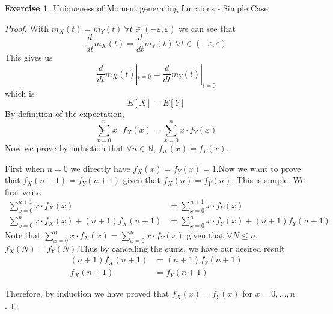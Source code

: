\documentclass[12pt,a4paper]{article}
\theoremstyle{definition}
\newtheorem{exercise}{Exercise}
\begin{document}
\begin{exercise}
    Uniqueness of Moment generating functions - Simple Case
    \begin{proof}
        With $m_X(t)=m_Y(t)\ \forall t\in (-\varepsilon,\varepsilon)$ we can see that
        \begin{equation*}
            \frac{d}{dt}m_X(t)=\frac{d}{dt}m_Y(t) \ \forall t\in (-\varepsilon,\varepsilon)
        \end{equation*}
        This gives us
        \begin{equation*}
            \frac{d}{dt}m_X(t)|_{t=0}=\frac{d}{dt}m_Y(t)|_{t=0}
        \end{equation*}
        which is
        \begin{equation*}
            E[X]=E[Y]
        \end{equation*}
        By definition of the expectation,
        \begin{equation*}
            \sum_{x=0}^{n} x\cdot f_X(x)=\sum_{x=0}^{n} x\cdot f_Y(x)
        \end{equation*}
        Now we prove by induction that $\forall n\in \mathbb{N}$, $f_X(x)=f_Y(x)$.

        First when $n=0$ we directly have $f_X(x)=f_Y(x)=1$.Now we want to prove that $f_X(n+1)=f_Y(n+1)$ given that $f_X(n)=f_Y(n)$. This is simple. We first write
        \begin{equation*}
            \begin{split}
            \sum_{x=0}^{n+1} x\cdot f_X(x)&=\sum_{x=0}^{n+1} x\cdot f_Y(x)\\
            \sum_{x=0}^n x\cdot f_X(x)+(n+1)f_X(n+1)&=\sum_{x=0}^n x\cdot f_Y(x) + (n+1)f_Y(n+1)
            \end{split}
        \end{equation*}
        Note that $\sum_{x=0}^n x\cdot f_X(x)=\sum_{x=0}^n x\cdot f_Y(x)$ given that $\forall N\leq n$, $f_X(N)=f_Y(N)$.Thus by cancelling the sums, we have our desired result
        \begin{equation*}
            \begin{split}
                (n+1)f_X(n+1)&=(n+1)f_Y(n+1)\\
                f_X(n+1)&=f_Y(n+1)
            \end{split}
        \end{equation*}
        
        Therefore, by induction we have proved that $f_X(x)=f_Y(x)$ for $x=0,...,n$.
    \end{proof}
\end{exercise}
\end{document}
